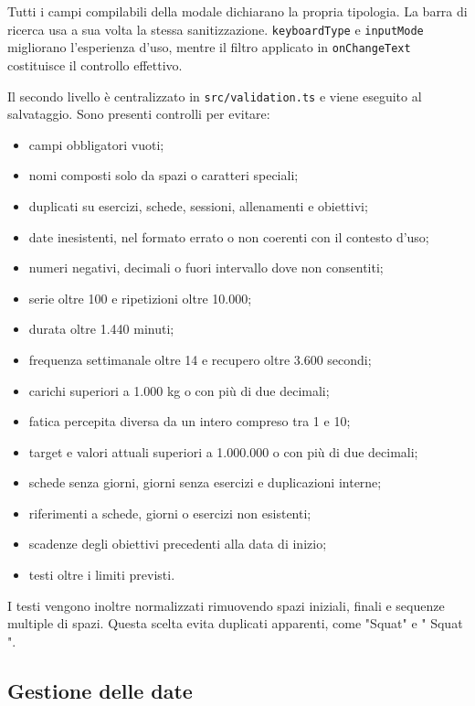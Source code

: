 \documentclass[11pt,a4paper]{article}
\begin{document}
Tutti i campi compilabili della modale dichiarano la propria tipologia. La barra di ricerca usa a sua volta la stessa sanitizzazione. \texttt{keyboardType} e \texttt{inputMode} migliorano l'esperienza d'uso, mentre il filtro applicato in \texttt{onChangeText} costituisce il controllo effettivo.

Il secondo livello è centralizzato in \texttt{src/validation.ts} e viene eseguito al salvataggio. Sono presenti controlli per evitare:

\begin{itemize}
  \item campi obbligatori vuoti;
  \item nomi composti solo da spazi o caratteri speciali;
  \item duplicati su esercizi, schede, sessioni, allenamenti e obiettivi;
  \item date inesistenti, nel formato errato o non coerenti con il contesto d'uso;
  \item numeri negativi, decimali o fuori intervallo dove non consentiti;
  \item serie oltre 100 e ripetizioni oltre 10.000;
  \item durata oltre 1.440 minuti;
  \item frequenza settimanale oltre 14 e recupero oltre 3.600 secondi;
  \item carichi superiori a 1.000 kg o con più di due decimali;
  \item fatica percepita diversa da un intero compreso tra 1 e 10;
  \item target e valori attuali superiori a 1.000.000 o con più di due decimali;
  \item schede senza giorni, giorni senza esercizi e duplicazioni interne;
  \item riferimenti a schede, giorni o esercizi non esistenti;
  \item scadenze degli obiettivi precedenti alla data di inizio;
  \item testi oltre i limiti previsti.
\end{itemize}

I testi vengono inoltre normalizzati rimuovendo spazi iniziali, finali e sequenze multiple di spazi. Questa scelta evita duplicati apparenti, come "Squat" e " Squat ".

\subsection{Gestione delle date}
\end{document}
